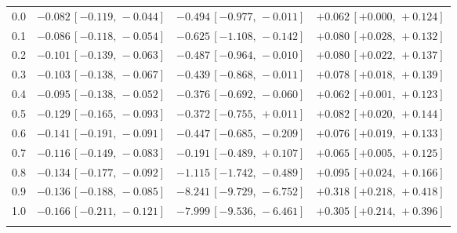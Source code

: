 \begin{table}[h]
\begin{tabular}{@{}lccc@{}}
\midrule
0.0 & $\mathbf{-0.082}\,[-0.119,\,-0.044]$ & $\mathbf{-0.494}\,[-0.977,\,-0.011]$ & $\mathbf{+0.062}\,[+0.000,\,+0.124]$ \\
0.1 & $\mathbf{-0.086}\,[-0.118,\,-0.054]$ & $\mathbf{-0.625}\,[-1.108,\,-0.142]$ & $\mathbf{+0.080}\,[+0.028,\,+0.132]$ \\
0.2 & $\mathbf{-0.101}\,[-0.139,\,-0.063]$ & $\mathbf{-0.487}\,[-0.964,\,-0.010]$ & $\mathbf{+0.080}\,[+0.022,\,+0.137]$ \\
0.3 & $\mathbf{-0.103}\,[-0.138,\,-0.067]$ & $\mathbf{-0.439}\,[-0.868,\,-0.011]$ & $\mathbf{+0.078}\,[+0.018,\,+0.139]$ \\
0.4 & $\mathbf{-0.095}\,[-0.138,\,-0.052]$ & $\mathbf{-0.376}\,[-0.692,\,-0.060]$ & $\mathbf{+0.062}\,[+0.001,\,+0.123]$ \\
0.5 & $\mathbf{-0.129}\,[-0.165,\,-0.093]$ & $-0.372\,[-0.755,\,+0.011]$ & $\mathbf{+0.082}\,[+0.020,\,+0.144]$ \\
0.6 & $\mathbf{-0.141}\,[-0.191,\,-0.091]$ & $\mathbf{-0.447}\,[-0.685,\,-0.209]$ & $\mathbf{+0.076}\,[+0.019,\,+0.133]$ \\
0.7 & $\mathbf{-0.116}\,[-0.149,\,-0.083]$ & $-0.191\,[-0.489,\,+0.107]$ & $\mathbf{+0.065}\,[+0.005,\,+0.125]$ \\
0.8 & $\mathbf{-0.134}\,[-0.177,\,-0.092]$ & $\mathbf{-1.115}\,[-1.742,\,-0.489]$ & $\mathbf{+0.095}\,[+0.024,\,+0.166]$ \\
0.9 & $\mathbf{-0.136}\,[-0.188,\,-0.085]$ & $\mathbf{-8.241}\,[-9.729,\,-6.752]$ & $\mathbf{+0.318}\,[+0.218,\,+0.418]$ \\
1.0 & $\mathbf{-0.166}\,[-0.211,\,-0.121]$ & $\mathbf{-7.999}\,[-9.536,\,-6.461]$ & $\mathbf{+0.305}\,[+0.214,\,+0.396]$ \\
\botrule
\end{tabular}
\end{table}
